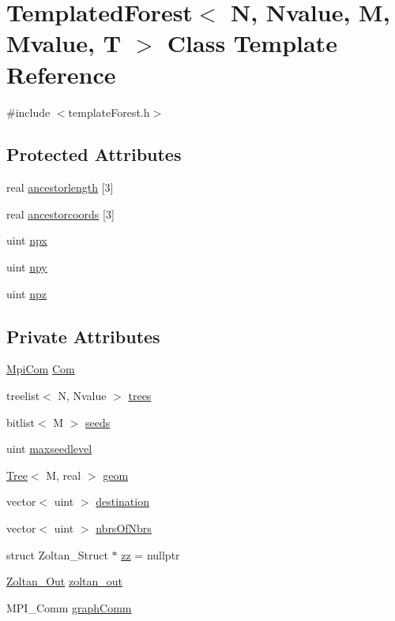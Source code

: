 \hypertarget{classTemplatedForest}{
\section{TemplatedForest$<$ N, Nvalue, M, Mvalue, T $>$ Class Template Reference}
\label{classTemplatedForest}
}


{\ttfamily \#include $<$templateForest.h$>$}\subsection*{Protected Attributes}
\begin{DoxyCompactItemize}
\item 
real \hyperlink{classTemplatedForest_a06f7d7d964f553fa04b7ec98022b1434}{ancestorlength} \mbox{[}3\mbox{]}
\item 
real \hyperlink{classTemplatedForest_a33e679903d44367ba048d401694b3eb5}{ancestorcoords} \mbox{[}3\mbox{]}
\item 
uint \hyperlink{classTemplatedForest_a5cf96af68fafcdde214e9125fc3bc8e2}{npx}
\item 
uint \hyperlink{classTemplatedForest_a4172d85562b587e738c55dcebea68d5a}{npy}
\item 
uint \hyperlink{classTemplatedForest_ad52e1ef3aa696efd96f73acce54d6bba}{npz}
\end{DoxyCompactItemize}
\subsection*{Private Attributes}
\begin{DoxyCompactItemize}
\item 
\hyperlink{structMpiCom}{MpiCom} \hyperlink{classTemplatedForest_ae035f47727cbf2b23e423c48b6dea3db}{Com}
\item 
treelist$<$ N, Nvalue $>$ \hyperlink{classTemplatedForest_af8453636607eeaa4f9594d698cf163a9}{trees}
\item 
bitlist$<$ M $>$ \hyperlink{classTemplatedForest_a49435a137ed1829498d249829139b4a9}{seeds}
\item 
uint \hyperlink{classTemplatedForest_ae87d21b2598b557756e71a66379373a9}{maxseedlevel}
\item 
\hyperlink{classTree}{Tree}$<$ M, real $>$ \hyperlink{classTemplatedForest_a269716c3758205686408d0ba4d40e1ea}{geom}
\item 
vector$<$ uint $>$ \hyperlink{classTemplatedForest_acd86a531acf3af46b1efc635301edd64}{destination}
\item 
vector$<$ uint $>$ \hyperlink{classTemplatedForest_aec4740142a33423f11d38fa4b6a0fa1b}{nbrsOfNbrs}
\item 
struct Zoltan\_\-Struct $\ast$ \hyperlink{classTemplatedForest_ad0940abd76a40dbb80c63ea322c6278b}{zz} = nullptr
\item 
\hyperlink{structZoltan__Out}{Zoltan\_\-Out} \hyperlink{classTemplatedForest_a4c6cc2bddf68e03763e76377df46b42a}{zoltan\_\-out}
\item 
MPI\_\-Comm \hyperlink{classTemplatedForest_ad6be6bd985ac82d6e6b9c6caa288f87b}{graphComm}
\end{DoxyCompactItemize}
